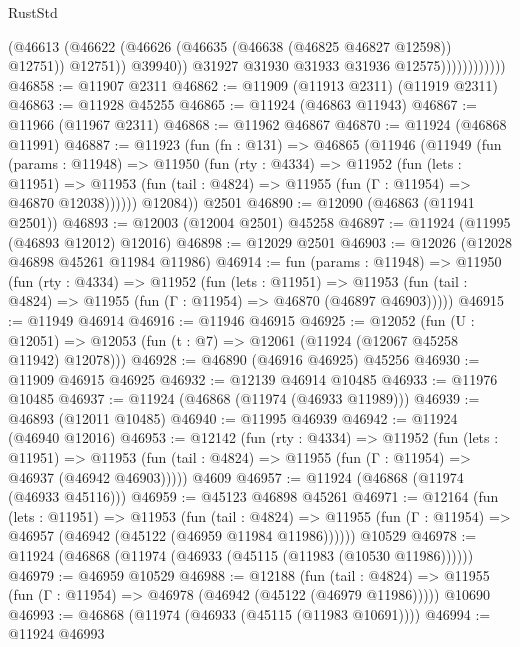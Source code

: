 \begin{lexlean}{RustStd}
\begin{coremodule}
{\begin{coremodule}
{{{{{{{{{{{{{{{{{{{{{{{{{{{{{{{{{{{{{{{{{{{{{{{{{{{{{{{{{{{{{{{{{{{{{{{{{{{{{{{{                                (@46613
                                  (@46622
                                    (@46626 (@46635 (@46638 (@46825 @46827 @12598)) @12751))
                                    @12751))
                                @39940))
                            @31927
                            @31930
                            @31933
                            @31936
                            @12575))))))))))))
@46858 := @11907 @2311
@46862 := @11909 (@11913 @2311) (@11919 @2311)
@46863 := @11928 @45255
@46865 := @11924 (@46863 @11943)
@46867 := @11966 (@11967 @2311)
@46868 := @11962 @46867
@46870 := @11924 (@46868 @11991)
@46887 := @11923
    (fun (fn : @131) =>
    @46865
      (@11946
        (@11949
          (fun (params : @11948) =>
          @11950
            (fun (rty : @4334) =>
            @11952
              (fun (lets : @11951) =>
              @11953 (fun (tail : @4824) => @11955 (fun (Γ : @11954) => @46870 @12038))))))
        @12084))
    @2501
@46890 := @12090 (@46863 (@11941 @2501))
@46893 := @12003 (@12004 @2501) @45258
@46897 := @11924 (@11995 (@46893 @12012) @12016)
@46898 := @12029 @2501
@46903 := @12026 (@12028 @46898 @45261 @11984 @11986)
@46914 := fun (params : @11948) =>
  @11950
    (fun (rty : @4334) =>
    @11952
      (fun (lets : @11951) =>
      @11953 (fun (tail : @4824) => @11955 (fun (Γ : @11954) => @46870 (@46897 @46903)))))
@46915 := @11949 @46914
@46916 := @11946 @46915
@46925 := @12052
    (fun (U : @12051) => @12053 (fun (t : @7) => @12061 (@11924 (@12067 @45258 @11942) @12078)))
@46928 := @46890 (@46916 @46925) @45256
@46930 := @11909 @46915 @46925
@46932 := @12139 @46914 @10485
@46933 := @11976 @10485
@46937 := @11924 (@46868 (@11974 (@46933 @11989)))
@46939 := @46893 (@12011 @10485)
@46940 := @11995 @46939
@46942 := @11924 (@46940 @12016)
@46953 := @12142
    (fun (rty : @4334) =>
    @11952
      (fun (lets : @11951) =>
      @11953 (fun (tail : @4824) => @11955 (fun (Γ : @11954) => @46937 (@46942 @46903)))))
    @4609
@46957 := @11924 (@46868 (@11974 (@46933 @45116)))
@46959 := @45123 @46898 @45261
@46971 := @12164
    (fun (lets : @11951) =>
    @11953
      (fun (tail : @4824) =>
      @11955 (fun (Γ : @11954) => @46957 (@46942 (@45122 (@46959 @11984 @11986))))))
    @10529
@46978 := @11924 (@46868 (@11974 (@46933 (@45115 (@11983 (@10530 @11986))))))
@46979 := @46959 @10529
@46988 := @12188
    (fun (tail : @4824) => @11955 (fun (Γ : @11954) => @46978 (@46942 (@45122 (@46979 @11986)))))
    @10690
@46993 := @46868 (@11974 (@46933 (@45115 (@11983 @10691))))
@46994 := @11924 @46993
}}}}}}}}}}}}}}}}}}}}}}}}}}}}}}}}}}}}}}}}}}}}}}}}}}}}}}}}}}}}}}}}}}}}}}}}}}}}}}}}
\end{coremodule}}
\end{coremodule}
\end{lexlean}
